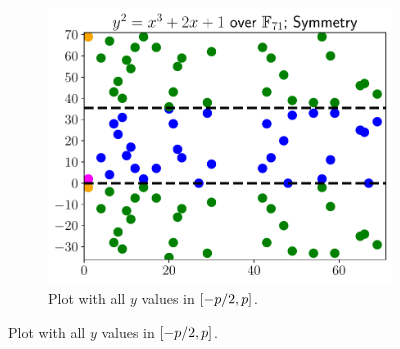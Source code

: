 \begin{figure}[p]
\centering
    \begin{subfigure}[t]{0.9\textwidth}
    \includegraphics[width=\textwidth]{plots/ec_finite/ec_finite_F_71_2_1_symmetry_base.pdf}
    \caption{Plot with all $y$ values in $\left[ -p/2,p \right]$.}
    \label{fig:ec_finite_plots_symmetry_main}
    \end{subfigure}


\end{figure}
